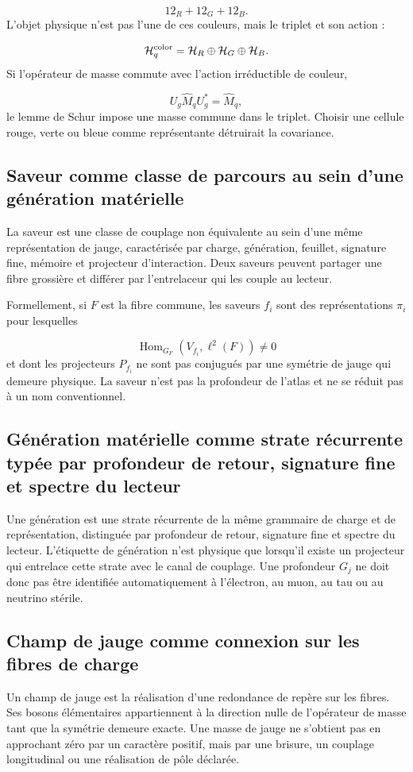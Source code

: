 \[
 12_R+12_G+12_B.
\]
L'objet physique n'est pas l'une de ces couleurs, mais le triplet et son action :

\[
 \mathcal H_q^{\rm color}
 =\mathcal H_R\oplus\mathcal H_G\oplus\mathcal H_B.
\]
Si l'opérateur de masse commute avec l'action irréductible de couleur,

\[
 U_g\widehat M_qU_g^*=\widehat M_q,
\]
le lemme de Schur impose une masse commune dans le triplet. Choisir une cellule rouge, verte ou bleue comme représentante détruirait la covariance.

\subsection{Saveur comme classe de parcours au sein d'une génération matérielle}
La saveur est une classe de couplage non équivalente au sein d'une même représentation de jauge, caractérisée par charge, génération, feuillet, signature fine, mémoire et projecteur d'interaction. Deux saveurs peuvent partager une fibre grossière et différer par l'entrelaceur qui les couple au lecteur.

Formellement, si \(F\) est la fibre commune, les saveurs \(f_i\) sont des représentations \(\pi_i\) pour lesquelles

\[
 \operatorname{Hom}_{G_F}(V_{f_i},\ell^2(F))\ne0
\]
et dont les projecteurs \(P_{f_i}\) ne sont pas conjugués par une symétrie de jauge qui demeure physique. La saveur n'est pas la profondeur de l'atlas et ne se réduit pas à un nom conventionnel.

\subsection{Génération matérielle comme strate récurrente typée par profondeur de retour, signature fine et spectre du lecteur}
Une génération est une strate récurrente de la même grammaire de charge et de représentation, distinguée par profondeur de retour, signature fine et spectre du lecteur. L'étiquette de génération n'est physique que lorsqu'il existe un projecteur qui entrelace cette strate avec le canal de couplage. Une profondeur \(G_j\) ne doit donc pas être identifiée automatiquement à l'électron, au muon, au tau ou au neutrino stérile.

\subsection{Champ de jauge comme connexion sur les fibres de charge}
Un champ de jauge est la réalisation d'une redondance de repère sur les fibres. Ses bosons élémentaires appartiennent à la direction nulle de l'opérateur de masse tant que la symétrie demeure exacte. Une masse de jauge ne s'obtient pas en approchant zéro par un caractère positif, mais par une brisure, un couplage longitudinal ou une réalisation de pôle déclarée.

